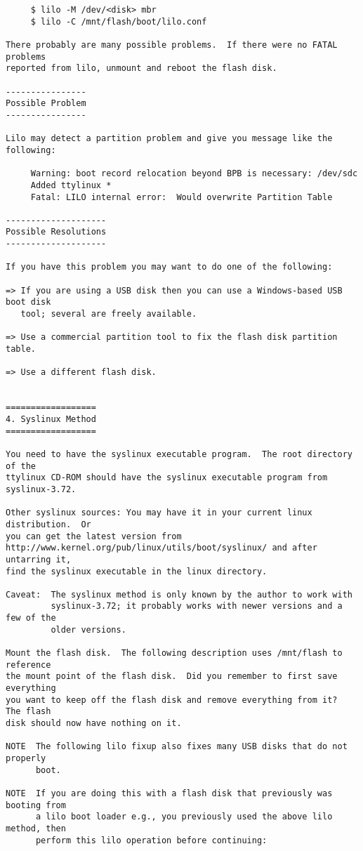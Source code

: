\documentclass[10pt]{article}
\begin{document}
\begin{lstlisting}
     $ lilo -M /dev/<disk> mbr
     $ lilo -C /mnt/flash/boot/lilo.conf

There probably are many possible problems.  If there were no FATAL problems
reported from lilo, unmount and reboot the flash disk.

----------------
Possible Problem
----------------

Lilo may detect a partition problem and give you message like the following:

     Warning: boot record relocation beyond BPB is necessary: /dev/sdc
     Added ttylinux *
     Fatal: LILO internal error:  Would overwrite Partition Table

--------------------
Possible Resolutions
--------------------

If you have this problem you may want to do one of the following:

=> If you are using a USB disk then you can use a Windows-based USB boot disk
   tool; several are freely available.

=> Use a commercial partition tool to fix the flash disk partition table.

=> Use a different flash disk.


==================
4. Syslinux Method
==================

You need to have the syslinux executable program.  The root directory of the
ttylinux CD-ROM should have the syslinux executable program from syslinux-3.72.

Other syslinux sources: You may have it in your current linux distribution.  Or
you can get the latest version from
http://www.kernel.org/pub/linux/utils/boot/syslinux/ and after untarring it,
find the syslinux executable in the linux directory.

Caveat:  The syslinux method is only known by the author to work with
         syslinux-3.72; it probably works with newer versions and a few of the
         older versions.

Mount the flash disk.  The following description uses /mnt/flash to reference
the mount point of the flash disk.  Did you remember to first save everything
you want to keep off the flash disk and remove everything from it?  The flash
disk should now have nothing on it.

NOTE  The following lilo fixup also fixes many USB disks that do not properly
      boot.

NOTE  If you are doing this with a flash disk that previously was booting from
      a lilo boot loader e.g., you previously used the above lilo method, then
      perform this lilo operation before continuing:


\end{lstlisting}
\end{document}
